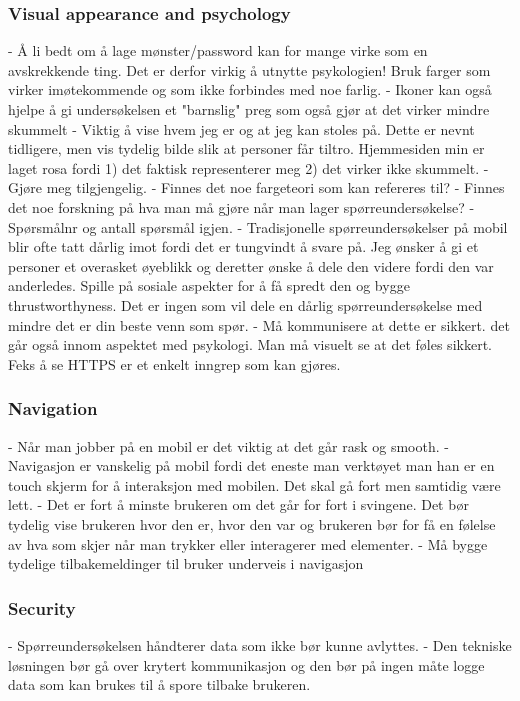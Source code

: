     \subsubsection*{Visual appearance and psychology}
      - Å li bedt om å lage mønster/password kan for mange virke som en avskrekkende ting. Det er derfor virkig å utnytte psykologien! Bruk farger som virker imøtekommende og som ikke forbindes med noe farlig. 
      - Ikoner kan også hjelpe å gi undersøkelsen et "barnslig" preg som også gjør at det virker mindre skummelt
      - Viktig å vise hvem jeg er og at jeg kan stoles på. Dette er nevnt tidligere, men vis tydelig bilde slik at personer får tiltro. Hjemmesiden min er laget rosa fordi 1) det faktisk representerer meg 2) det virker ikke skummelt.
      - Gjøre meg tilgjengelig.
      - Finnes det noe fargeteori som kan refereres til?
      - Finnes det noe forskning på hva man må gjøre når man lager spørreundersøkelse?
      - Spørsmålnr og antall spørsmål igjen. 
      - Tradisjonelle spørreundersøkelser på mobil blir ofte tatt dårlig imot fordi det er tungvindt å svare på. Jeg ønsker å gi et personer et overasket øyeblikk og deretter ønske å dele den videre fordi den var anderledes. Spille på sosiale aspekter for å få spredt den og bygge thrustworthyness. Det er ingen som vil dele en dårlig spørreundersøkelse med mindre det er din beste venn som spør. 
      - Må kommunisere at dette er sikkert. det går også innom aspektet med psykologi. Man må visuelt se at det føles sikkert. Feks å se HTTPS er et enkelt inngrep som kan gjøres.

    \subsubsection*{Navigation}
      - Når man jobber på en mobil er det viktig at det går rask og smooth.
      - Navigasjon er vanskelig på mobil fordi det eneste man verktøyet man han er en touch skjerm for å interaksjon med mobilen. Det skal gå fort men samtidig være lett.
      - Det er fort å minste brukeren om det går for fort i svingene. Det bør tydelig vise brukeren hvor den er, hvor den var og brukeren bør for få en følelse av hva som skjer når man trykker eller interagerer med elementer. 
      - Må bygge tydelige tilbakemeldinger til bruker underveis i navigasjon

    \subsubsection*{Security}
      - Spørreundersøkelsen håndterer data som ikke bør kunne avlyttes. 
      - Den tekniske løsningen bør gå over krytert kommunikasjon og den bør på ingen måte logge data som kan brukes til å spore tilbake brukeren.


